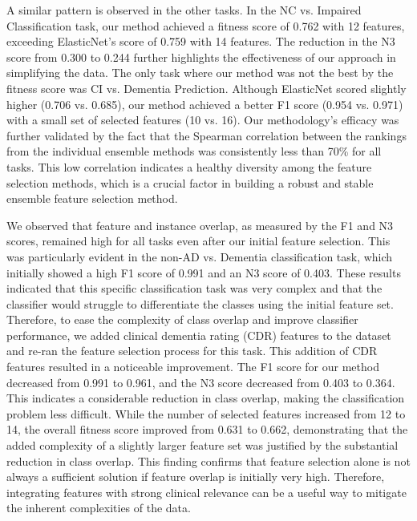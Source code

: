 A similar pattern is observed in the other tasks. In the NC vs. Impaired Classification task, our method achieved a fitness score of 0.762 with 12 features, exceeding ElasticNet's score of 0.759 with 14 features. The reduction in the N3 score from 0.300 to 0.244 further highlights the effectiveness of our approach in simplifying the data. The only task where our method was not the best by the fitness score was CI vs. Dementia Prediction. Although ElasticNet scored slightly higher (0.706 vs. 0.685), our method achieved a better F1 score (0.954 vs. 0.971) with a small set of selected features (10 vs. 16). Our methodology's efficacy was further validated by the fact that the Spearman correlation between the rankings from the individual ensemble methods was consistently less than 70\% for all tasks. This low correlation indicates a healthy diversity among the feature selection methods, which is a crucial factor in building a robust and stable ensemble feature selection method.

We observed that feature and instance overlap, as measured by the F1 and N3 scores, remained high for all tasks even after our initial feature selection. This was particularly evident in the non-AD vs. Dementia classification task, which initially showed a high F1 score of 0.991 and an N3 score of 0.403. These results indicated that this specific classification task was very complex and that the classifier would struggle to differentiate the classes using the initial feature set. Therefore, to ease the complexity of class overlap and improve classifier performance, we added clinical dementia rating (CDR) features to the dataset and re-ran the feature selection process for this task. This addition of CDR features resulted in a noticeable improvement. The F1 score for our method decreased from 0.991 to 0.961, and the N3 score decreased from 0.403 to 0.364. This indicates a considerable reduction in class overlap, making the classification problem less difficult. While the number of selected features increased from 12 to 14, the overall fitness score improved from 0.631 to 0.662, demonstrating that the added complexity of a slightly larger feature set was justified by the substantial reduction in class overlap. This finding confirms that feature selection alone is not always a sufficient solution if feature overlap is initially very high. Therefore, integrating features with strong clinical relevance can be a useful way to mitigate the inherent complexities of the data.


